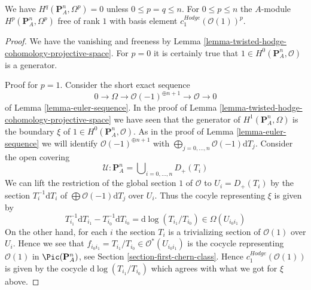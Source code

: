 \begin{lemma}
\label{lemma-hodge-cohomology-projective-space}
We have $H^q(\mathbf{P}^n_A, \Omega^p) = 0$
unless $0 \leq p = q \leq n$. For $0 \leq p \leq n$ the $A$-module
$H^p(\mathbf{P}^n_A, \Omega^p)$ free of rank $1$ with basis element
$c_1^{Hodge}(\mathcal{O}(1))^p$.
\end{lemma}

\begin{proof}
We have the vanishing and freeness by
Lemma \ref{lemma-twisted-hodge-cohomology-projective-space}.
For $p = 0$ it is certainly true that
$1 \in H^0(\mathbf{P}^n_A, \mathcal{O})$ is a generator.

\medskip\noindent
Proof for $p = 1$. Consider the short exact sequence
$$
0 \to \Omega \to \mathcal{O}(-1)^{\oplus n + 1} \to \mathcal{O} \to 0
$$
of Lemma \ref{lemma-euler-sequence}. In the proof of
Lemma \ref{lemma-twisted-hodge-cohomology-projective-space}
we have seen that the generator of $H^1(\mathbf{P}^n_A, \Omega)$
is the boundary $\xi$ of $1 \in H^0(\mathbf{P}^n_A, \mathcal{O})$.
As in the proof of Lemma \ref{lemma-euler-sequence} we will identify
$\mathcal{O}(-1)^{\oplus n + 1}$ with
$\bigoplus_{j = 0, \ldots, n} \mathcal{O}(-1)\text{d}T_j$.
Consider the open covering
$$
\mathcal{U} : 
\mathbf{P}^n_A =
\bigcup\nolimits_{i = 0, \ldots, n} D_{+}(T_i)
$$
We can lift the restriction of the global section $1$ of $\mathcal{O}$
to $U_i = D_+(T_i)$ by the section $T_i^{-1} \text{d}T_i$ of
$\bigoplus \mathcal{O}(-1)\text{d}T_j$ over $U_i$. Thus the cocyle
representing $\xi$ is given by
$$
T_{i_1}^{-1} \text{d}T_{i_1} - T_{i_0}^{-1} \text{d}T_{i_0} =
\text{d}\log(T_{i_1}/T_{i_0}) \in \Omega(U_{i_0i_1})
$$
On the other hand, for each $i$ the section $T_i$ is a trivializing
section of $\mathcal{O}(1)$ over $U_i$. Hence we see that
$f_{i_0i_1} = T_{i_1}/T_{i_0} \in \mathcal{O}^*(U_{i_0i_1})$
is the cocycle representing $\mathcal{O}(1)$ in $\Pic(\mathbf{P}^n_A)$,
see Section \ref{section-first-chern-class}.
Hence $c_1^{Hodge}(\mathcal{O}(1))$
is given by the cocycle $\text{d}\log(T_{i_1}/T_{i_0})$
which agrees with what we got for $\xi$ above.


\end{proof}
